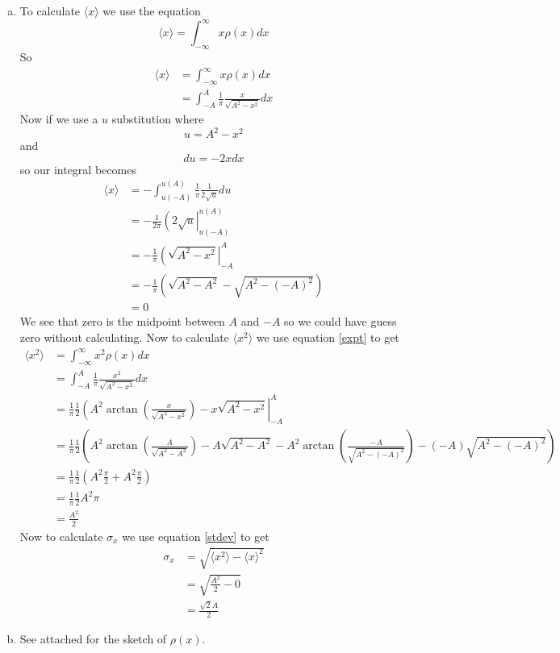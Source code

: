 \documentclass[11pt]{article}
\numberwithin{equation}{section}
\begin{document}
\begin{enumerate}[(a)]
\item
To calculate $\langle x\rangle$ we use the equation
\begin{equation}
\langle x\rangle = \int_{-\infty}^{\infty}x\rho(x)dx
\label{expt}
\end{equation}
So 
\begin{align*}
\langle x\rangle &= \int_{-\infty}^{\infty}x\rho(x)dx\\
&= \int_{-A}^{A}\frac{1}{\pi}\frac{x}{\sqrt{A^2-x^2}}dx
\end{align*}
Now if we use a $u$ substitution where
$$u = A^2-x^2$$
and
$$du = -2xdx$$
so our integral becomes 
\begin{align*}
\langle x\rangle &= -\int_{u(-A)}^{u(A)}\frac{1}{\pi}\frac{1}{2\sqrt{u}}du\\
&= -\frac{1}{2\pi}\left(2\sqrt{u}\right|_{u(-A)}^{u(A)}\\
&= -\frac{1}{\pi}\left(\sqrt{A^2-x^2}\right|_{-A}^{A}\\
&= -\frac{1}{\pi}\left(\sqrt{A^2-A^2}-\sqrt{A^2-(-A)^2}\right)\\
&= 0
\end{align*}
We see that zero is the midpoint between $A$ and $-A$ so we could have guess zero without calculating. Now to calculate $\langle x^2\rangle$ we use equation \ref{expt} to get
\begin{align*}
\langle x^2\rangle &= \int_{-\infty}^{\infty}x^2\rho(x)dx\\
&= \int_{-A}^{A}\frac{1}{\pi}\frac{x^2}{\sqrt{A^2-x^2}}dx\\
&= \frac{1}{\pi}\frac{1}{2}\left(A^2\arctan\left(\frac{x}{\sqrt{A^2-x^2}}\right)-x\sqrt{A^2-x^2}\right|_{-A}^{A}\\
&= \frac{1}{\pi}\frac{1}{2}\left(A^2\arctan\left(\frac{A}{\sqrt{A^2-A^2}}\right)-A\sqrt{A^2-A^2}-A^2\arctan\left(\frac{-A}{\sqrt{A^2-(-A)^2}}\right)-(-A)\sqrt{A^2-(-A)^2}\right)\\
&= \frac{1}{\pi}\frac{1}{2}\left(A^2\frac{\pi}{2} + A^2\frac{\pi}{2}\right)\\
&= \frac{1}{\pi}\frac{1}{2}A^2\pi\\
&= \frac{A^2}{2}
\end{align*}
Now to calculate $\sigma_x$ we use equation \ref{stdev} to get
\begin{align}
\sigma_x &= \sqrt{\langle x^2\rangle - \langle x\rangle^2}\\
&= \sqrt{\frac{A^2}{2} - 0}\\
&= \frac{\sqrt{2}A}{2}
\end{align}


\item
See attached for the sketch of $\rho(x)$.
\end{enumerate}
\end{document}
